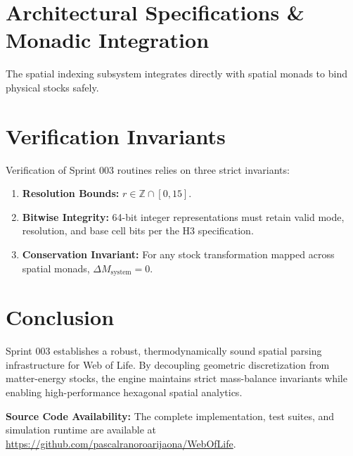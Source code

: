 \documentclass[11pt, a4paper]{article}
\begin{document}
\section{Architectural Specifications \& Monadic Integration}
The spatial indexing subsystem integrates directly with spatial monads to bind physical stocks safely.


\section{Verification Invariants}
Verification of Sprint 003 routines relies on three strict invariants:
\begin{enumerate}
    \item \textbf{Resolution Bounds:} $r \in \mathbb{Z} \cap [0, 15]$.
    \item \textbf{Bitwise Integrity:} 64-bit integer representations must retain valid mode, resolution, and base cell bits per the H3 specification.
    \item \textbf{Conservation Invariant:} For any stock transformation mapped across spatial monads, $\Delta M_{\text{system}} = 0$.
\end{enumerate}

\section{Conclusion}
Sprint 003 establishes a robust, thermodynamically sound spatial parsing infrastructure for Web of Life. By decoupling geometric discretization from matter-energy stocks, the engine maintains strict mass-balance invariants while enabling high-performance hexagonal spatial analytics.

\vspace{1em}
\noindent\textbf{Source Code Availability:} The complete implementation, test suites, and simulation runtime are available at \url{https://github.com/pascalranoroarijaona/WebOfLife}.
\end{document}
